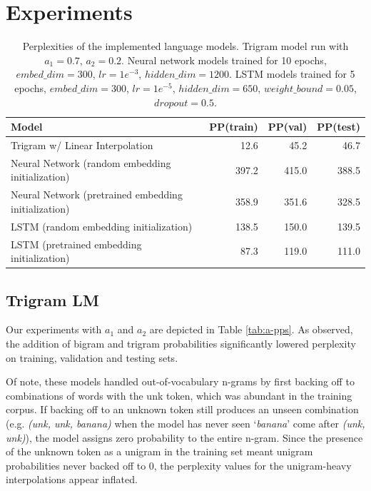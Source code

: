 \documentclass[11pt]{article}
\begin{document}
\section{Experiments}

\begin{table}[h]
  \centering
  \begin{tabular}{@{}lrrr@{}}
  \toprule
  \textbf{Model} & \textbf{PP(train)} & \textbf{PP(val)} & \textbf{PP(test)} \\ \midrule
  Trigram w/ Linear Interpolation & 12.6 & 45.2 & 46.7 \\
  Neural Network (random embedding initialization) & 397.2 & 415.0 & 388.5 \\ 
  Neural Network (pretrained embedding initialization) & 358.9 & 351.6 & 328.5 \\ 
  LSTM (random embedding initialization) & 138.5 & 150.0 & 139.5 \\ 
  LSTM (pretrained embedding initialization) & 87.3 & 119.0 & 111.0 \\ 
  \bottomrule
  \end{tabular}
  \caption{Perplexities of the implemented language models. Trigram model run with $a_1=0.7$, $a_2=0.2$. Neural network models trained for 10 epochs, $embed\_dim=300$, $lr=1e^{-3}$, $hidden\_dim=1200$. LSTM models trained for 5 epochs, $embed\_dim=300$, $lr=1e^{-5}$, $hidden\_dim=650$, $weight\_bound=0.05$, $dropout=0.5$.}
  \label{tab:perplexities}
\end{table}

\subsection{Trigram LM}

Our experiments with $a_1$ and $a_2$ are depicted in Table \ref{tab:a-pps}. As observed, the addition of bigram and trigram probabilities significantly lowered perplexity on training, validation and testing sets. 

Of note, these models handled out-of-vocabulary n-grams by first backing off to combinations of words with the unk token, which was abundant in the training corpus. If backing off to an unknown token still produces an unseen combination (e.g. \textit{(unk, unk, banana)} when the model has never seen `\textit{banana}' come after \textit{(unk, unk)}), the model assigns zero probability to the entire n-gram. Since the presence of the unknown token as a unigram in the training set meant unigram probabilities never backed off to 0, the perplexity values for the unigram-heavy interpolations appear inflated.
\end{document}
